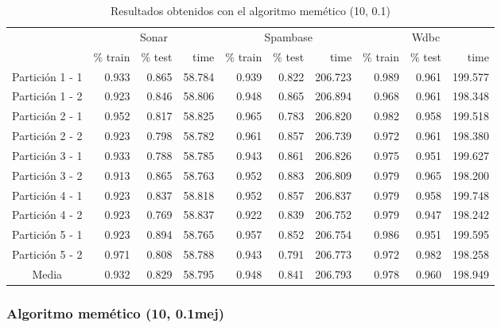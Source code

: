 \documentclass[11pt]{article}
\theoremstyle{plain}
\theoremstyle{definition}
\begin{document}
\begin{table}[H]
\centering
\caption{Resultados obtenidos con el algoritmo memético (10, 0.1)}
\label{tbl-amb}
\begin{tabular}{@{}crrrrrrrrr@{}}
  \toprule
  & \multicolumn{3}{c}{Sonar} & \multicolumn{3}{c}{Spambase} & \multicolumn{3}{c}{Wdbc}  \\
  \cmidrule(r){2-10}
           & \% train & \% test & time & \% train   & \% test   & time & \% train & \% test & time \\
  \midrule
Partición 1 - 1   & 0.933 & 0.865 & 58.784 & 0.939 & 0.822 & 206.723 & 0.989 & 0.961 & 199.577 \\
Partición 1 - 2   & 0.923 & 0.846 & 58.806 & 0.948 & 0.865 & 206.894 & 0.968 & 0.961 & 198.348 \\
Partición 2 - 1   & 0.952 & 0.817 & 58.825 & 0.965 & 0.783 & 206.820 & 0.982 & 0.958 & 199.518 \\
Partición 2 - 2   & 0.923 & 0.798 & 58.782 & 0.961 & 0.857 & 206.739 & 0.972 & 0.961 & 198.380 \\
Partición 3 - 1   & 0.933 & 0.788 & 58.785 & 0.943 & 0.861 & 206.826 & 0.975 & 0.951 & 199.627 \\
Partición 3 - 2   & 0.913 & 0.865 & 58.763 & 0.952 & 0.883 & 206.809 & 0.979 & 0.965 & 198.200 \\
Partición 4 - 1   & 0.923 & 0.837 & 58.818 & 0.952 & 0.857 & 206.837 & 0.979 & 0.958 & 199.748 \\
Partición 4 - 2   & 0.923 & 0.769 & 58.837 & 0.922 & 0.839 & 206.752 & 0.979 & 0.947 & 198.242 \\
Partición 5 - 1   & 0.923 & 0.894 & 58.765 & 0.957 & 0.852 & 206.754 & 0.986 & 0.951 & 199.595 \\
Partición 5 - 2   & 0.971 & 0.808 & 58.788 & 0.943 & 0.791 & 206.773 & 0.972 & 0.982 & 198.258 \\
  \bottomrule
Media             & 0.932 & 0.829 & 58.795 & 0.948 & 0.841 & 206.793 & 0.978 & 0.960 & 198.949 \\
\end{tabular}
\end{table}

\subsubsection{Algoritmo memético (10, 0.1mej)}
\end{document}
